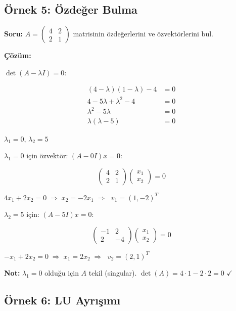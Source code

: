 \documentclass[12pt,a4paper]{article}
\theoremstyle{definition}
\theoremstyle{remark}
\begin{document}
\subsection{\"Ornek 5: \"Ozde\u{g}er Bulma}

\textbf{Soru:} $A = \begin{pmatrix} 4 & 2 \\ 2 & 1 \end{pmatrix}$ matrisinin \"ozde\u{g}erlerini ve \"ozvekt\"orlerini bul.

\textbf{\c{C}\"oz\"um:}

$\det(A - \lambda I) = 0$:

\begin{align*}
(4-\lambda)(1-\lambda) - 4 &= 0 \\
4 - 5\lambda + \lambda^2 - 4 &= 0 \\
\lambda^2 - 5\lambda &= 0 \\
\lambda(\lambda - 5) &= 0
\end{align*}

$\lambda_1 = 0$, $\lambda_2 = 5$

$\lambda_1 = 0$ i\c{c}in \"ozvekt\"or: $(A - 0I)x = 0$:

\[
\begin{pmatrix} 4 & 2 \\ 2 & 1 \end{pmatrix} \begin{pmatrix} x_1 \\ x_2 \end{pmatrix} = 0
\]

$4x_1 + 2x_2 = 0 \;\Rightarrow\; x_2 = -2x_1 \;\Rightarrow\;$ $v_1 = (1, -2)^T$

$\lambda_2 = 5$ i\c{c}in: $(A - 5I)x = 0$:

\[
\begin{pmatrix} -1 & 2 \\ 2 & -4 \end{pmatrix} \begin{pmatrix} x_1 \\ x_2 \end{pmatrix} = 0
\]

$-x_1 + 2x_2 = 0 \;\Rightarrow\; x_1 = 2x_2 \;\Rightarrow\;$ $v_2 = (2, 1)^T$

\textbf{Not:} $\lambda_1 = 0$ oldu\u{g}u i\c{c}in $A$ tekil (singular). $\det(A) = 4 \cdot 1 - 2 \cdot 2 = 0$ $\checkmark$

\subsection{\"Ornek 6: LU Ayr{\i}\c{s}{\i}m{\i}}
\end{document}
